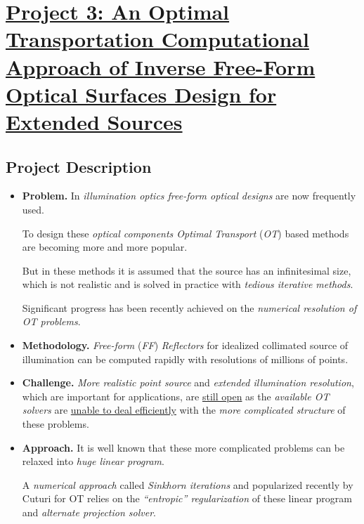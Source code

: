 \documentclass{book}
\numberwithin{equation}{section}
\begin{document}

\chapter{\href{https://www.romsoc.eu/an-optimal-transportation-computational-approach-of-inverse-free-form-optical-surfaces-design-for-extended-sources/}{Project 3: An Optimal Transportation Computational Approach of Inverse Free-Form Optical Surfaces Design for Extended Sources}}

\section{Project Description}
\begin{itemize}
    \item \textbf{Problem.} In \textit{illumination optics free-form optical designs} are now frequently used.
    
    To design these \textit{optical components Optimal Transport} (\textit{OT}) based methods are becoming more and more popular.
    
    But in these methods it is assumed that the source has an infinitesimal size, which is not realistic and is solved in practice with \textit{tedious iterative methods}.
    
    Significant progress has been recently achieved on the \textit{numerical resolution of OT problems}.
    \item \textbf{Methodology.} \textit{Free-form} (\textit{FF}) \textit{Reflectors} for idealized collimated source of illumination can be computed rapidly with resolutions of millions of points.
    \item \textbf{Challenge.} \textit{More realistic point source} and \textit{extended illumination resolution}, which are important for applications, are \underline{still open} as the \textit{available OT solvers} are \underline{unable to deal efficiently} with the \textit{more complicated structure} of these problems.
    \item \textbf{Approach.} It is well known that these more complicated problems can be relaxed into \textit{huge linear program}.
    
    A \textit{numerical approach} called \textit{Sinkhorn iterations} and popularized recently by Cuturi for OT relies on the \textit{``entropic'' regularization} of these linear program and \textit{alternate projection solver}.
    

\end{itemize}
\end{document}
